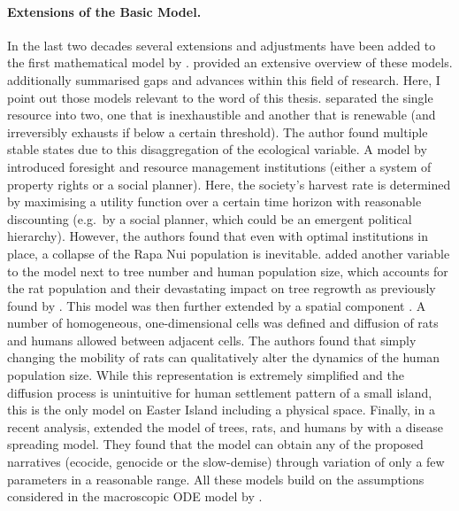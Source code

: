 \paragraph{Extensions of the Basic Model.}
In the last two decades several extensions and adjustments have been added to the first mathematical model by \citet{Brander1998}.
\citet{Reuveny2012} provided an extensive overview of these models.
\citet{Merico2017} additionally summarised gaps and advances within this field of research. 
Here, I point out those models relevant to the word of this thesis.
\citet{dAlessandro2007} separated the single resource into two, one that is inexhaustible and another that is renewable (and irreversibly exhausts if below a certain threshold).
The author found multiple stable states due to this disaggregation of the ecological variable. 
A model by \citet{Good2006} introduced foresight and resource management institutions (either a system of property rights or a social planner).
Here, the society's harvest rate is determined by maximising a utility function over a certain time horizon with reasonable discounting (e.g.\ by a social planner, which could be an emergent political hierarchy).
However, the authors found that even with optimal institutions in place, a collapse of the Rapa Nui population is inevitable.
\citet{Basener2008} added another variable to the model next to tree number and human population size, which accounts for the rat population and their devastating impact on tree regrowth as previously found by \citet{Hunt2007}. 
This model was then further extended by a spatial component \citep{Basener2011}. 
A number of homogeneous, one-dimensional cells was defined and diffusion of rats and humans allowed between adjacent cells. 
The authors found that simply changing the mobility of rats can qualitatively alter the dynamics of the human population size.
While this representation is extremely simplified and the diffusion process is unintuitive for human settlement pattern of a small island, this is the only model on Easter Island including a physical space.
Finally, in a recent analysis, \citet{Brandt2015} extended the model of trees, rats, and humans by \citet{Basener2008} with a disease spreading model.
They found that the model can obtain any of the proposed narratives (ecocide, genocide or the slow-demise) through variation of only a few parameters in a reasonable range.
All these models build on the assumptions considered in the macroscopic ODE model by \citet{Brander1998}.



